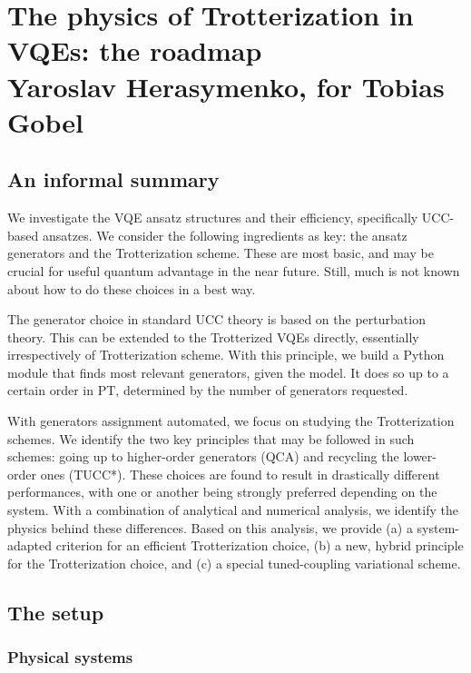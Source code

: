 \documentclass[10pt, a4paper]{article}
\begin{document}
\section*{The physics of Trotterization in VQEs: the roadmap\\
\small{Yaroslav Herasymenko, for Tobias Gobel}}

\subsection*{An informal summary}

We investigate the VQE ansatz structures and their efficiency, specifically UCC-based ansatzes. We consider the following ingredients as key: the ansatz generators and the Trotterization scheme. These are most basic, and may be crucial for useful quantum advantage in the near future. Still, much is not known about how to do these choices in a best way.

The generator choice in standard UCC theory is based on the perturbation theory. This can be extended to the Trotterized VQEs directly, essentially irrespectively of Trotterization scheme. With this principle, we build a Python module that finds most relevant generators, given the model. It does so up to a certain order in PT, determined by the number of generators requested.

With generators assignment automated, we focus on studying the Trotterization schemes. We identify the two key principles that may be followed in such schemes: going up to higher-order generators (QCA) and recycling the lower-order ones (TUCC*). These choices are found to result in drastically different performances, with one or another being strongly preferred depending on the system. With a combination of analytical and numerical analysis, we identify the physics behind these differences. Based on this analysis, we provide (a) a system-adapted criterion for an efficient Trotterization choice, (b) a new, hybrid principle for the Trotterization choice, and (c) a special tuned-coupling variational scheme.

\subsection*{The setup}


\subsubsection*{Physical systems}
\end{document}
